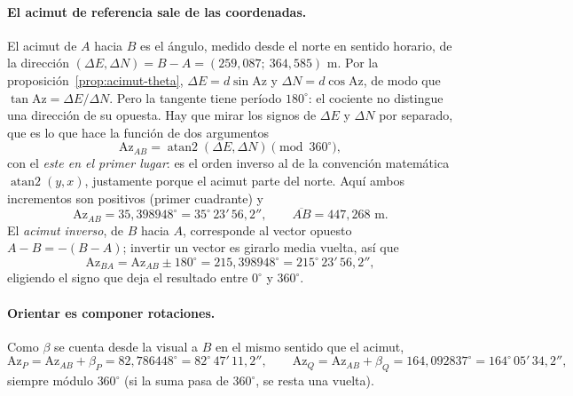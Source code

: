 \paragraph{El acimut de referencia sale de las coordenadas.} El acimut de \(A\) hacia \(B\) es
el ángulo, medido desde el norte en sentido horario, de la dirección
\((\Delta E,\Delta N)=B-A=(259{,}087;\ 364{,}585)\) m. Por la
proposición~\ref{prop:acimut-theta}, \(\Delta E=d\sin\mathrm{Az}\) y
\(\Delta N=d\cos\mathrm{Az}\), de modo que \(\tan\mathrm{Az}=\Delta E/\Delta N\). Pero la
tangente tiene período \(180^\circ\): el cociente no distingue una dirección de su opuesta. Hay
que mirar los signos de \(\Delta E\) y \(\Delta N\) por separado, que es lo que hace la función
de dos argumentos
\[
\mathrm{Az}_{AB}=\operatorname{atan2}(\Delta E,\Delta N)\pmod{360^\circ},
\]
con el \emph{este en el primer lugar}: es el orden inverso al de la convención matemática
\(\operatorname{atan2}(y,x)\), justamente porque el acimut parte del norte. Aquí ambos
incrementos son positivos (primer cuadrante) y
\[
\mathrm{Az}_{AB}=35{,}398948^\circ=35^\circ\,23'\,56{,}2'',\qquad
\overline{AB}=447{,}268\text{ m}.
\]
El \emph{acimut inverso}, de \(B\) hacia \(A\), corresponde al vector opuesto
\(A-B=-(B-A)\); invertir un vector es girarlo media vuelta, así que
\[
\mathrm{Az}_{BA}=\mathrm{Az}_{AB}\pm180^\circ=215{,}398948^\circ=215^\circ\,23'\,56{,}2'',
\]
eligiendo el signo que deja el resultado entre \(0^\circ\) y \(360^\circ\).

\paragraph{Orientar es componer rotaciones.} Como \(\beta\) se cuenta desde la visual a \(B\)
en el mismo sentido que el acimut,
\[
\mathrm{Az}_P=\mathrm{Az}_{AB}+\beta_P=82{,}786448^\circ=82^\circ\,47'\,11{,}2'',\qquad
\mathrm{Az}_Q=\mathrm{Az}_{AB}+\beta_Q=164{,}092837^\circ=164^\circ\,05'\,34{,}2'',
\]
siempre módulo \(360^\circ\) (si la suma pasa de \(360^\circ\), se resta una vuelta).

